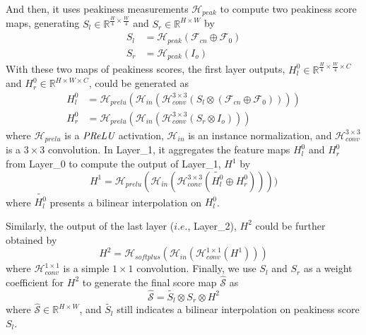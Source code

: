 \documentclass[journal]{IEEEtran}
\begin{document}
And then, it uses peakiness measurements $\mathcal{H}_{peak}$ to compute two peakiness score maps, generating $S_l \in \mathbb{R}^{\frac{H}{4} \times \frac{W}{4}}{}$ and $S_r \in \mathbb{R}^{H\times W}$ by
\begin{align}\label{eq-ps-det}
        S_l&=\mathcal{H}_{peak}(\mathcal{F}_{cn} \oplus \mathcal{F}_{0}) \\
        S_r&=\mathcal{H}_{peak}(I_o)
\end{align}
With these two maps of peakiness scores, the first layer outputs, $H^0_l\in \mathbb{R}^{\frac{H}{4} \times \frac{W}{4} \times C}$ and $H^0_r\in \mathbb{R}^{H\times W \times C}$, could be generated as
\begin{align}\label{eq-fo-det}
        H^0_l&=\mathcal{H}_{prelu}(\mathcal{H}_{in}(\mathcal{H}^{3\times3}_{conv}(S_l\otimes (\mathcal{F}_{cn} \oplus \mathcal{F}_{0})))) \\
        H^0_r&=\mathcal{H}_{prelu}(\mathcal{H}_{in}(\mathcal{H}^{3\times3}_{conv}(S_r\otimes I_{o})))
\end{align}
where $\mathcal{H}_{prelu}$ is a $\emph{PReLU}$ activation, $\mathcal{H}_{in}$ is an instance normalization, and $\mathcal{H}^{3\times3}_{conv}$ is a $3\times 3$ convolution. In Layer\_1, it aggregates the feature maps $H^0_l$ and $H^0_r$ from Layer\_0 to compute the output of Layer\_1, $H^1$ by
\begin{equation}\label{eq-o2}
        H^1=\mathcal{H}_{prelu}(\mathcal{H}_{in}(\mathcal{H}^{3\times3}_{conv}(\widetilde{H^0_l} \oplus H^0_r))))
\end{equation}
where $\widetilde{H^0_l}$ presents a bilinear interpolation on ${H^0_l}$. 

Similarly, the output of the last layer ($i.e.$, Layer\_2), $H^2$ could be further obtained by
\begin{equation}\label{eq-o3}
        H^2=\mathcal{H}_{softplus}(\mathcal{H}_{in}(\mathcal{H}^{1\times1}_{conv}(H^1)))
\end{equation} 
where $\mathcal{H}^{1\times1}_{conv}$ is a simple $1\times 1$ convolution. Finally, we use $S_l$ and $S_r$ as a weight coefficient for $H^2$ to generate the final score map $\widehat{\mathcal{S}}$ as
\begin{equation}\label{eq-s}
    \widehat{\mathcal{S}}=\widetilde{S_{l}} \otimes S_{r} \otimes H^2
\end{equation}
where $\widehat{\mathcal{S}} \in \mathbb{R}^{H\times W}$, and $\widetilde{S_l}$ still indicates a bilinear interpolation on peakiness score $S_l$.
\end{document}
